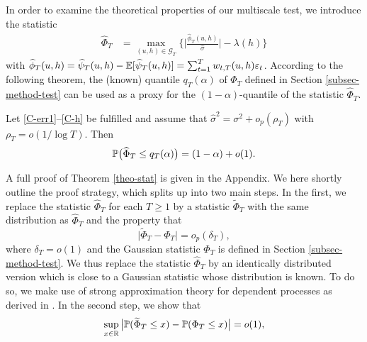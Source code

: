 In order to examine the theoretical properties of our multiscale test, we introduce the statistic 
\begin{align}
\widehat{\Phi}_T 
 & = \max_{(u,h) \in \mathcal{G}_T} \Big\{ \Big| \frac{\widehat{\phi}_T(u,h)}{\widehat{\sigma}} \Big| - \lambda(h) \Big\} \label{Phi-hat-statistic}
\end{align}
with $\widehat{\phi}_T(u,h) = \widehat{\psi}_T(u,h) - \mathbb{E} [\widehat{\psi}_T(u,h)] = \sum\nolimits_{t=1}^T w_{t,T}(u,h) \varepsilon_t$. According to the following theorem, the (known) quantile $q_T(\alpha)$ of $\Phi_T$ defined in Section \ref{subsec-method-test} can be used as a proxy for the $(1-\alpha)$-quantile of the statistic $\widehat{\Phi}_T$.
\begin{theorem}\label{theo-stat}
Let \ref{C-err1}--\ref{C-h} be fulfilled and assume that $\widehat{\sigma}^2 = \sigma^2 + o_p(\rho_T)$ with $\rho_T = o(1/\log T)$. Then 
\[ \mathbb{P} \big( \widehat{\Phi}_T \le q_T(\alpha) \big) = (1 - \alpha) + o(1). \]
\end{theorem}
A full proof of Theorem \ref{theo-stat} is given in the Appendix. 
We here shortly outline the proof strategy, which splits up into two main steps. In the first, we replace the statistic $\widehat{\Phi}_T$ for each $T \ge 1$ by a statistic $\widetilde{\Phi}_T$ with the same distribution as $\widehat{\Phi}_T$ and the property that 
\begin{equation}\label{eq-theo-stat-strategy-step1}
\big| \widetilde{\Phi}_T - \Phi_T \big| = o_p(\delta_T),
\end{equation}
where $\delta_T = o(1)$ and the Gaussian statistic $\Phi_T$ is defined in Section \ref{subsec-method-test}. We thus replace the statistic $\widehat{\Phi}_T$ by an identically distributed version which is close to a Gaussian statistic whose distribution is known. To do so, we make use of strong approximation theory for dependent processes as derived in \cite{BerkesLiuWu2014}. In the second step, we show that 
\begin{equation}\label{eq-theo-stat-strategy-claim}
\sup_{x \in \mathbb{R}} \big| \mathbb{P}(\widetilde{\Phi}_T \le x) - \mathbb{P}(\Phi_T \le x) \big| = o(1), 
\end{equation}
